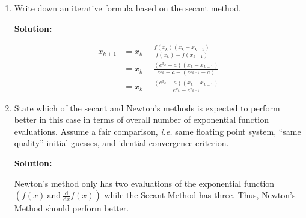 \documentclass[12pt]{article}
\begin{document}
\begin{enumerate}
\begin{enumerate}
\begin{align*}
  g(x) &= \sum_{n=0}^{\infty}\frac{g^{(n)}\left( x^{*}\right)}{n!}\left(x - x^{*}\right)^{n}\\
  \intertext{For $n=0$ we get $g\left(x^{*}\right) = 0$ and for $n=1$ we get $g^{\prime}\left(x^{*}\right) = -1$, this changes our series to}
  g\left(x_{k}\right) &= 0 - \xi_{k} + \sum_{n=2}^{\infty} \frac{g^{(n)}\left(x^{*}\right)}{n!}\xi_{k}^{n}
  \intertext{where we can replace this into the iterative equation from above, giving}
  x_{k+1} &= x_{k} - \xi_{k} + \sum_{n=2}^{\infty} \frac{g^{(n)}\left(x^{*}\right)}{n!}\xi_{k}^{n}\\
          &= x_{k} - \xi_{k} + \xi_{k}^{2}\sum_{n=2}^{\infty} \frac{g^{(n)}\left(x^{*}\right)}{n!}\xi_{k}^{n-2}\\
  \intertext{Finally, after subtracting $x^{*}$ from both sides, gives}
  \xi_{k+1} = x_{k+1} - x^{*} &= \xi_{k} - \xi_{k} + \xi_{k}^{2}\sum_{n=2}^{\infty} \frac{g^{(n)}\left(x^{*}\right)}{n!}\xi_{k}^{n-2}\\
                              &= \xi_{k}^{2}\sum_{n=2}^{\infty} \frac{g^{(n)}\left(x^{*}\right)}{n!}\xi_{k}^{n-2}
\end{align*}

So it is quadratically convergent.

\item Write down an iterative formula based on the secant method.

{\bf Solution:}

\begin{align*}
x_{k+1} &= x_{k} - \frac{f\left(x_{k}\right) \left(x_{k} - x_{k-1}\right)}{f\left(x_{k}\right) - f\left(x_{k-1}\right)}\\
        &= x_{k} - \frac{\left(e^{x_{k}} - a\right)\left(x_{k} - x_{k-1}\right)}{e^{x_{k}} - a - \left(e^{x_{k-1}} - a\right)}\\
        &= x_{k} - \frac{\left(e^{x_{k}} - a\right)\left(x_{k} - x_{k-1}\right)}{e^{x_{k}} - e^{x_{k-1}}}
\end{align*}

\item State which of the secant and Newton's methods is expected to perform better in
this case in terms of overall number of exponential function evaluations. Assume a fair
comparison, {\em i.e.} same floating point system, ``same quality'' initial guesses, and idential
convergence criterion.

{\bf Solution:}

Newton's method only has two evaluations of the exponential function $\left(f(x)\ \text{and}\ \frac{\text{d}}{\text{d}x}f(x) \right)$
while the Secant Method has three. Thus, Newton's Method should perform better.



\end{enumerate}
\end{enumerate}
\end{document}
